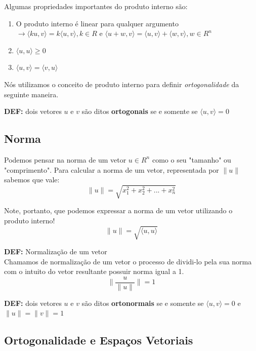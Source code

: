\documentclass[12pt]{article}
\begin{document}
	Algumas propriedades importantes do produto interno são:
	\begin{enumerate}
		\item O produto interno é linear para qualquer argumento $\rightarrow \langle ku,v \rangle=k\langle u,v \rangle,k\in R$ e $\langle u+w,v \rangle=\langle u,v \rangle+\langle w,v \rangle,w\in R^{n}$
		\item $\langle u,u \rangle\geq0$
		\item $\langle u,v \rangle=\langle v,u \rangle$
	\end{enumerate}
	
	Nós utilizamos o conceito de produto interno para definir \textit{ortogonalidade} da seguinte maneira.
	
	\textbf{DEF:} dois vetores $u$ e $v$ são ditos \textbf{ortogonais} se e somente se $\langle u,v \rangle=0$
	
	\subsection{Norma}
	Podemos pensar na norma de um vetor $u\in R^{n}$ como o seu "tamanho" ou "comprimento". Para calcular a norma de um vetor, representada por $\lVert u \rVert$ sabemos que vale:
	\begin{equation*}
		\lVert u \rVert=\sqrt{x_{1}^{2}+x_{2}^{2}+...+x_{n}^{2}}
	\end{equation*}
	
	Note, portanto, que podemos expressar a norma de um vetor utilizando o produto interno!
	\begin{equation*}
		\lVert u \rVert=\sqrt{\langle u,u \rangle}
	\end{equation*}
	
	\textbf{DEF:} Normalização de um vetor\\ Chamamos de normalização de um vetor o processo de dividi-lo pela sua norma com o intuito do vetor resultante possuir norma igual a 1.
	\begin{equation*}
		\lVert \dfrac{u}{\lVert u \rVert}\rVert=1
	\end{equation*}
	
	\textbf{DEF:} dois vetores $u$ e $v$ são ditos \textbf{ortonormais} se e somente se $\langle u,v \rangle=0$ e $\lVert u \rVert=\lVert v \rVert=1$
	
	\subsection{Ortogonalidade e Espaços Vetoriais}
	
\end{document}
